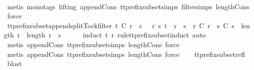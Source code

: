 \begin{isabellebody}
\ \ \isamarkupfalse%
\ {\isacharparenleft}metis\ {\isacharparenleft}mono{\isacharunderscore}tags{\isacharcomma}\ lifting{\isacharparenright}\ append{\isacharunderscore}Cons\ tt{\isacharunderscore}prefix{\isacharunderscore}subset{\isachardot}simps{\isacharparenleft}{}{\isacharparenright}\ filter{\isachardot}simps{\isacharparenleft}{}{\isacharparenright}\ length{\isacharunderscore}Cons{\isacharcomma}\ force{\isacharplus}{\isacharparenright}\isanewline
\ \ \isamarkupfalse%
%
\endisatagproof
{\isafoldproof}%
%
\isadelimproof
\isanewline
%
\endisadelimproof
\isanewline
{}\isamarkupfalse%
\ tt{\isacharunderscore}prefix{\isacharunderscore}subset{\isacharunderscore}append{\isacharunderscore}split{\isacharunderscore}Tock{\isacharunderscore}filter{\isacharcolon}\ {\isachardoublequoteopen}t\ {\isasymlesssim}\isactrlsub C\ r\ {\isacharat}\ s\ {\isasymLongrightarrow}\ {\isasymexists}\ r{\isacharprime}\ s{\isacharprime}{\isachardot}\ t\ {\isacharequal}\ r{\isacharprime}\ {\isacharat}\ s{\isacharprime}\ {\isasymand}\ r{\isacharprime}\ {\isasymlesssim}\isactrlsub C\ r\ {\isasymand}\ s{\isacharprime}\ {\isasymlesssim}\isactrlsub C\ s\ {\isasymand}\ {\isacharparenleft}length\ r{\isacharprime}\ {\isacharequal}\ length\ r\ {\isasymor}\ s{\isacharprime}\ {\isacharequal}\ {\isacharbrackleft}{\isacharbrackright}{\isacharparenright}{\isachardoublequoteclose}\isanewline
%
\isadelimproof
\ \ %
\endisadelimproof
%
\isatagproof
{}\isamarkupfalse%
\ {\isacharparenleft}induct\ t\ {\isachardoublequoteopen}r{\isachardoublequoteclose}\ rule{\isacharcolon}tt{\isacharunderscore}prefix{\isacharunderscore}subset{\isachardot}induct{\isacharcomma}\ auto{\isacharparenright}\isanewline
\ \ \isamarkupfalse%
\ {\isacharparenleft}metis\ append{\isacharunderscore}Cons\ tt{\isacharunderscore}prefix{\isacharunderscore}subset{\isachardot}simps{\isacharparenleft}{}{\isacharparenright}\ length{\isacharunderscore}Cons{\isacharcomma}\ force{\isacharparenright}\isanewline
\ \ \isamarkupfalse%
\ {\isacharparenleft}metis\ append{\isacharunderscore}Cons\ tt{\isacharunderscore}prefix{\isacharunderscore}subset{\isachardot}simps{\isacharparenleft}{}{\isacharparenright}\ length{\isacharunderscore}Cons{\isacharcomma}\ force{\isacharparenright}\isanewline
\ \ \isamarkupfalse%
\ tt{\isacharunderscore}prefix{\isacharunderscore}subset{\isacharunderscore}refl\ \isamarkupfalse%
\ blast%
\endisatagproof
{\isafoldproof}%
%
\isadelimproof
\isanewline

\end{isabellebody}
